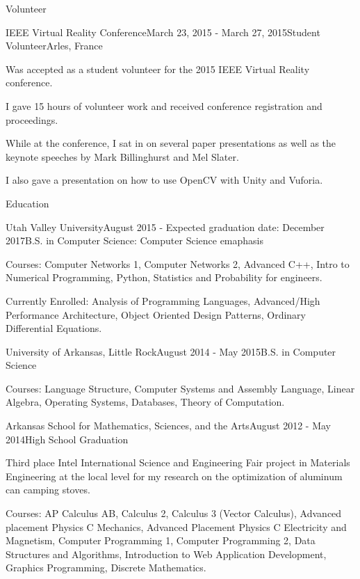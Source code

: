 \documentclass{resume} %
\begin{document}
\begin{rSection}{Volunteer}

\begin{rSubsection}{IEEE Virtual Reality Conference}{March 23, 2015 - March 27, 2015}{Student Volunteer}{Arles, France}
	\item Was accepted as a student volunteer for the 2015 IEEE Virtual Reality conference.
	\item I gave 15 hours of volunteer work and received conference registration and proceedings.
	\item While at the conference, I sat in on several paper presentations as well as the keynote speeches by Mark Billinghurst and Mel Slater.
	\item I also gave a presentation on how to use OpenCV with Unity and Vuforia.
\end{rSubsection}

\end{rSection}


\begin{rSection}{Education}

\begin{rSubsection}{Utah Valley University}{August 2015 - Expected graduation date: December 2017}{B.S. in Computer Science: Computer Science emaphasis}
\item Courses: Computer Networks 1, Computer Networks 2, Advanced C++, Intro to Numerical Programming, Python, Statistics and Probability for engineers.
\item Currently Enrolled: Analysis of Programming Languages, Advanced/High Performance Architecture, Object Oriented Design Patterns, Ordinary Differential Equations.
\end{rSubsection}

\begin{rSubsection}{University of Arkansas, Little Rock}{August 2014 - May 2015}{B.S. in Computer Science}
	\item Courses: Language Structure, Computer Systems and Assembly Language, Linear Algebra, Operating Systems, Databases, Theory of Computation.
\end{rSubsection}

\begin{rSubsection}{Arkansas School for Mathematics, Sciences, and the Arts}{August 2012 - May 2014}{High School Graduation}
	\item Third place Intel International Science and Engineering Fair project in Materials Engineering at the local level for my research on the optimization of aluminum can camping stoves.
	\item Courses: AP Calculus AB, Calculus 2, Calculus 3 (Vector Calculus), Advanced placement Physics C Mechanics, Advanced Placement Physics C Electricity and Magnetism, Computer Programming 1, Computer Programming 2, Data Structures and Algorithms, Introduction to Web Application Development, Graphics Programming, Discrete Mathematics.
\end{rSubsection}

\end{rSection}
\end{document}
